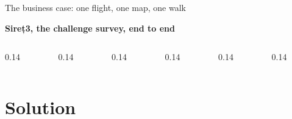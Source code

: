 \documentclass[aspectratio=169, 11pt, t]{beamer}
\begin{document}
\begin{frame}{The business case: one flight, one map, one walk}
  \vspace{8mm}
  {\scriptsize\bfseries\color{sxNight} Sireț3, the challenge survey, end to end\par}
  \vspace{1.5mm}
  \begin{columns}[T]
    \begin{column}{0.14\textwidth}\end{column}
    \begin{column}{0.14\textwidth}\end{column}
    \begin{column}{0.14\textwidth}\end{column}
    \begin{column}{0.14\textwidth}\end{column}
    \begin{column}{0.14\textwidth}\end{column}
    \begin{column}{0.14\textwidth}\end{column}
  \end{columns}
\end{frame}

\section{Solution}
\end{document}
